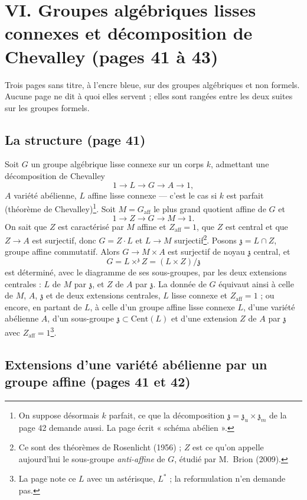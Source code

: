 \documentclass[11pt,a4paper]{article}
\begin{document}
\section*{VI. Groupes algébriques lisses connexes et décomposition de Chevalley (pages 41 à 43)}

Trois pages sans titre, à l'encre bleue, sur des groupes algébriques et non
formels. Aucune page ne dit à quoi elles servent ; elles sont rangées entre
les deux suites sur les groupes formels.

\subsection*{La structure (page 41)}

Soit $G$ un groupe algébrique lisse connexe sur un corps $k$, admettant une
décomposition de Chevalley
\[
1 \to L \to G \to A \to 1,
\]
$A$ variété abélienne, $L$ affine lisse connexe — c'est le cas si $k$ est
parfait (théorème de Chevalley)\footnote{On suppose désormais $k$ parfait,
ce que la décomposition $\mathfrak{z} = \mathfrak{z}_u \times \mathfrak{z}_m$
de la page 42 demande aussi. La page écrit « schéma abélien ».}. Soit
$M = G_{\mathrm{aff}}$ le plus grand quotient affine de $G$ et
\[
1 \to Z \to G \to M \to 1 .
\]
On sait que $Z$ est caractérisé par $M$ affine et $Z_{\mathrm{aff}} = 1$,
que $Z$ est central et que $Z \to A$ est surjectif, donc $G = Z \cdot L$ et
$L \to M$ surjectif\footnote{Ce sont des théorèmes de Rosenlicht (1956) ;
$Z$ est ce qu'on appelle aujourd'hui le sous-groupe \emph{anti-affine} de
$G$, étudié par M.~Brion (2009).}. Posons $\mathfrak{z} = L \cap Z$,
groupe affine commutatif. Alors $G \to M \times A$ est surjectif de noyau
$\mathfrak{z}$ central, et
\[
G = L \times^{\mathfrak{z}} Z = (L \times Z)/\mathfrak{z}
\]
est déterminé, avec le diagramme de ses sous-groupes, par les deux
extensions centrales : $L$ de $M$ par $\mathfrak{z}$, et $Z$ de $A$ par
$\mathfrak{z}$. La donnée de $G$ équivaut ainsi à celle de $M$, $A$,
$\mathfrak{z}$ et de deux extensions centrales, $L$ lisse connexe et
$Z_{\mathrm{aff}} = 1$ ; ou encore, en partant de $L$, à celle d'un groupe
affine lisse connexe $L$, d'une variété abélienne $A$, d'un sous-groupe
$\mathfrak{z} \subset \mathrm{Cent}(L)$ et d'une extension $Z$ de $A$ par
$\mathfrak{z}$ avec $Z_{\mathrm{aff}} = 1$\footnote{La page note ce $L$ avec
un astérisque, $L^{*}$ ; la reformulation n'en demande pas.}.

\subsection*{Extensions d'une variété abélienne par un groupe affine (pages 41 et 42)}
\end{document}
